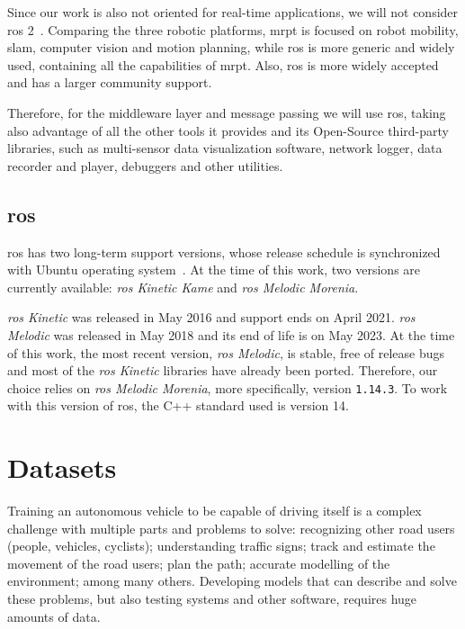 Since our work is also not oriented for real-time applications, we will not consider \ac{ros} 2~\cite{ROS2}. Comparing the three robotic platforms, \ac{mrpt} is focused on robot mobility, \ac{slam}, computer vision and motion planning, while \ac{ros} is more generic and widely used, containing all the capabilities of \ac{mrpt}. Also, \ac{ros} is more widely accepted and has a larger community support.

Therefore, for the middleware layer and message passing we will use \ac{ros}, taking also advantage of all the other tools it provides and its Open-Source third-party libraries, such as multi-sensor data visualization software, network logger, data recorder and player, debuggers and other utilities.

\subsection{\acl{ros}}
\ac{ros} has two long-term support versions, whose release schedule is synchronized with Ubuntu operating system~\cite{ROS}. At the time of this work, two versions are currently available: \textit{\ac{ros} Kinetic Kame} and \textit{\ac{ros} Melodic Morenia}.

\textit{\ac{ros} Kinetic} was released in May 2016 and support ends on April 2021. \textit{\ac{ros} Melodic} was released in May 2018 and its end of life is on May 2023. At the time of this work, the most recent version, \textit{\ac{ros} Melodic}, is stable, free of release bugs and most of the \textit{\ac{ros} Kinetic} libraries have already been ported. Therefore, our choice relies on \textit{\ac{ros} Melodic Morenia}, more specifically, version \texttt{1.14.3}. To work with this version of \ac{ros}, the C++ standard used is version 14.


\section{Datasets}
\label{sec:sota:datasets}

Training an autonomous vehicle to be capable of driving itself is a complex challenge with multiple parts and problems to solve: recognizing other road users (people, vehicles, cyclists); understanding traffic signs; track and estimate the movement of the road users; plan the path; accurate modelling of the environment; among many others. Developing models that can describe and solve these problems, but also testing systems and other software, requires huge amounts of data.

